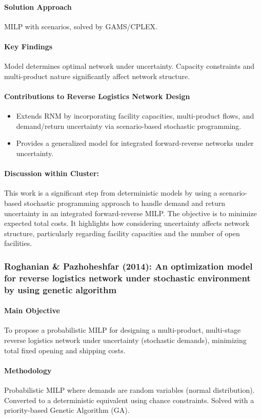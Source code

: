 \paragraph{Solution Approach} MILP with scenarios, solved by GAMS/CPLEX.
\paragraph{Key Findings} Model determines optimal network under uncertainty. Capacity constraints and multi-product nature significantly affect network structure.
\paragraph{Contributions to Reverse Logistics Network Design}
\begin{itemize}
    \item Extends RNM by incorporating facility capacities, multi-product flows, and demand/return uncertainty via scenario-based stochastic programming.
    \item Provides a generalized model for integrated forward-reverse networks under uncertainty.
\end{itemize}
\paragraph{Discussion within Cluster:} This work is a significant step from deterministic models by using a scenario-based stochastic programming approach to handle demand and return uncertainty in an integrated forward-reverse MILP. The objective is to minimize expected total costs. It highlights how considering uncertainty affects network structure, particularly regarding facility capacities and the number of open facilities.

\subsubsection{Roghanian \& Pazhoheshfar (2014): An optimization model for reverse logistics network under stochastic environment by using genetic algorithm}
\paragraph{Main Objective} To propose a probabilistic MILP for designing a multi-product, multi-stage reverse logistics network under uncertainty (stochastic demands), minimizing total fixed opening and shipping costs.
\paragraph{Methodology} Probabilistic MILP where demands are random variables (normal distribution). Converted to a deterministic equivalent using chance constraints. Solved with a priority-based Genetic Algorithm (GA).
